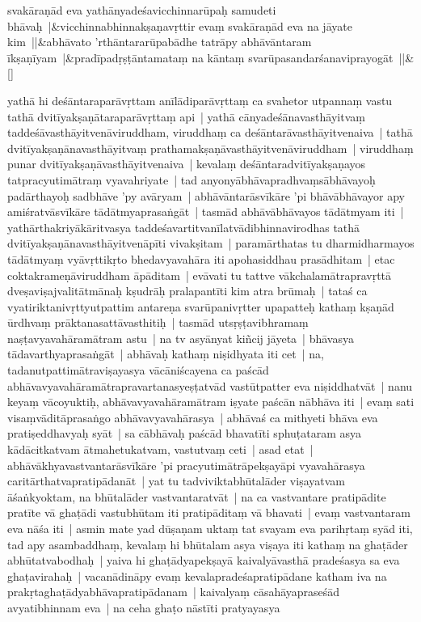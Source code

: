 \documentclass[article,12pt,a4paper]{memoir}%
\newcommand{\name}[1]{#1}
\newcounter{parCount}
\begin{document}
	    
	    \stanza[\smallbreak]
	  svakāraṇād eva yathānyadeśavicchinnarūpaḥ samudeti bhāvaḥ |&vicchinnabhinnakṣaṇavṛttir evaṃ svakāraṇād eva na jāyate kim ||&abhāvato 'rthāntararūpabādhe tatrāpy abhāvāntaram īkṣaṇīyam |&pradīpadṛṣṭāntamataṃ na kāntaṃ svarūpasandarśanaviprayogāt ||\&[\smallbreak]
	  
	  
	  

	  \pstart \leavevmode%
	\label{thakur75-122.6}yathā hi deśāntaraparāvṛttam anīlādiparāvṛttaṃ ca svahetor utpannaṃ vastu tathā dvitīyakṣaṇātaraparāvṛttaṃ api | yathā cānyadeśānavasthāyitvaṃ taddeśāvasthāyitvenāviruddham, viruddhaṃ ca deśāntarāvasthāyitvenaiva | tathā dvitīyakṣaṇānavasthāyitvaṃ prathamakṣaṇāvasthāyitvenāviruddham | viruddhaṃ punar dvitīyakṣaṇāvasthāyitvenaiva | kevalaṃ deśāntaradvitīyakṣaṇayos tatpracyutimātraṃ vyavahriyate | tad anyonyābhāvapradhvaṃsābhāvayoḥ padārthayoḥ sadbhāve 'py avāryam | abhāvāntarāsvīkāre 'pi bhāvābhāvayor apy amiśratvāsvīkāre tādātmyaprasaṅgāt | tasmād abhāvābhāvayos tādātmyam iti | \label{thakur75-122.16} yathārthakriyākāritvasya taddeśavartitvanīlatvādibhinnavirodhas tathā dvitīyakṣaṇānavasthāyitvenāpīti vivakṣitam | paramārthatas tu dharmidharmayos tādātmyaṃ vyāvṛttikṛto bhedavyavahāra iti \name{apohasiddhau} prasādhitam | etac coktakrameṇāviruddham āpāditam | evāvati tu tattve vākchalamātrapravṛttā dveṣaviṣajvalitātmānaḥ kṣudrāḥ pralapantīti kim atra brūmaḥ | \label{thakur75-122.21} tataś ca vyatiriktanivṛttyutpattim antareṇa svarūpanivṛtter upapatteḥ kathaṃ kṣaṇād ūrdhvaṃ prāktanasattāvasthitiḥ | tasmād utsṛṣṭavibhramaṃ naṣṭavyavahāramātram astu | na tv asyānyat kiñcij jāyeta | \label{thakur75-122.23} bhāvasya tādavarthyaprasaṅgāt | abhāvaḥ kathaṃ niṣidhyata iti cet | \label{thakur75-122.24} na, tadanutpattimātraviṣayasya vācāniścayena ca paścād abhāvavyavahāramātrapravartanasyeṣṭatvād vastūtpatter eva niṣiddhatvāt | \label{thakur75-122.26} nanu keyaṃ vācoyuktiḥ, abhāvavyavahāramātram iṣyate paścān nābhāva iti | evaṃ sati visaṃvāditāprasaṅgo abhāvavyavahārasya | abhāvaś ca mithyeti bhāva eva pratiṣeddhavyaḥ syāt | sa cābhāvaḥ paścād bhavatīti sphuṭataram asya kādācitkatvam ātmahetukatvam, vastutvaṃ ceti | \label{thakur75-122.29} asad etat | abhāvākhyavastvantarāsvīkāre 'pi pracyutimātrāpekṣayāpi vyavahārasya caritārthatvapratipādanāt | yat tu tadviviktabhūtalāder viṣayatvam āśaṅkyoktam, na bhūtalāder vastvantaratvāt | na ca vastvantare pratipādite pratīte vā ghaṭādi vastubhūtam iti pratipāditaṃ vā bhavati | \label{thakur75-123.1} evaṃ vastvantaram eva nāśa iti | asmin mate yad dūṣaṇam uktaṃ tat svayam eva parihṛtaṃ syād iti, tad apy asambaddhaṃ, kevalaṃ hi bhūtalam asya viṣaya iti kathaṃ na ghaṭāder abhūtatvabodhaḥ | yaiva hi ghaṭādyapekṣayā kaivalyāvasthā pradeśasya sa eva ghaṭavirahaḥ | vacanādināpy evaṃ kevalapradeśapratipādane katham iva na prakṛtaghaṭādyabhāvapratipādanam | kaivalyaṃ cāsahāyapraseśād avyatibhinnam eva | \label{thakur75-123.6} na ceha ghaṭo nāstīti pratyayasya 
\end{document}
